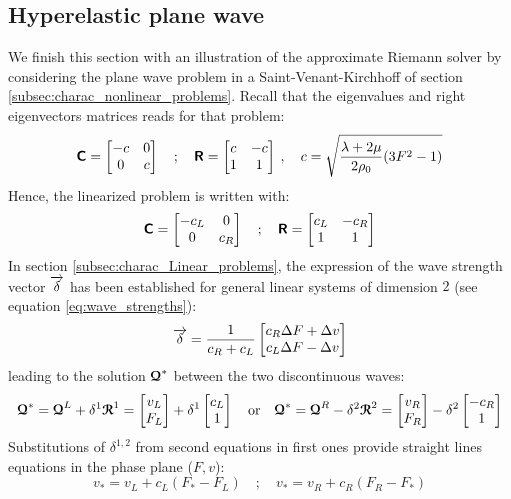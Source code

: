\subsection{Hyperelastic plane wave}
We finish this section with an illustration of the approximate Riemann solver by considering the plane wave problem in a Saint-Venant-Kirchhoff of section \ref{subsec:charac_nonlinear_problems}.
Recall that the eigenvalues and right eigenvectors matrices reads for that problem:
\begin{equation}
  \label{eq:SVK_matrices}
  \boldsymbol{\mathsf{C}} = \left[\begin{matrix}-c & 0 \\ 0 & c\end{matrix}\right] \quad ; \quad \boldsymbol{\mathsf{R}} = \left[\begin{matrix}c & -c\\ 1&1\end{matrix}\right] \:,\quad c=\sqrt{\frac{\lambda + 2\mu}{2\rho_0}(3F^2-1)}
\end{equation}
Hence, the linearized problem is written with:
\begin{equation}
  \label{eq:SVK_matrices_linear}
  \boldsymbol{\mathsf{C}} = \left[\begin{matrix}-c_L & 0 \\ 0 & c_R\end{matrix}\right] \quad ; \quad \boldsymbol{\mathsf{R}} = \left[\begin{matrix}c_L & -c_R\\ 1&1\end{matrix}\right]
\end{equation}
In section \ref{subsec:charac_Linear_problems}, the expression of the wave strength vector ${\overrightarrow{\delta}}$ has been established for general linear systems of dimension $2$ (see equation \eqref{eq:wave_strengths}):
\begin{equation}
  {\overrightarrow{\delta}}=\frac{1}{c_R+c_L}\left[\begin{matrix}c_R \Delta F +\Delta v\\ c_L \Delta F -\Delta v\end{matrix}\right]
\end{equation}
leading to the solution ${\boldsymbol{\mathcal{Q}}}^*$ between the two discontinuous waves:
\begin{equation}
  \label{eq:SVK_approx_solution}
  {\boldsymbol{\mathcal{Q}}}^* = {\boldsymbol{\mathcal{Q}}}^L + \delta^1 {\boldsymbol{\mathcal{R}}}^1 = \left[\begin{matrix}v_L \\F_L\end{matrix}\right] +\delta^1 \left[\begin{matrix}c_L \\1\end{matrix}\right] \quad \text{or} \quad {\boldsymbol{\mathcal{Q}}}^* = {\boldsymbol{\mathcal{Q}}}^R - \delta^2 {\boldsymbol{\mathcal{R}}}^2 = \left[\begin{matrix}v_R \\F_R\end{matrix}\right] -\delta^2 \left[\begin{matrix}-c_R \\1\end{matrix}\right]
\end{equation}
Substitutions of $\delta^{1,2}$ from second equations in first ones provide straight lines equations in the phase plane ($F,v$):
\begin{equation}
  \label{eq:approx_straight}
  v_* = v_L + c_L(F_*-F_L) \quad ; \quad v_* = v_R + c_R(F_R-F_*)
\end{equation}
